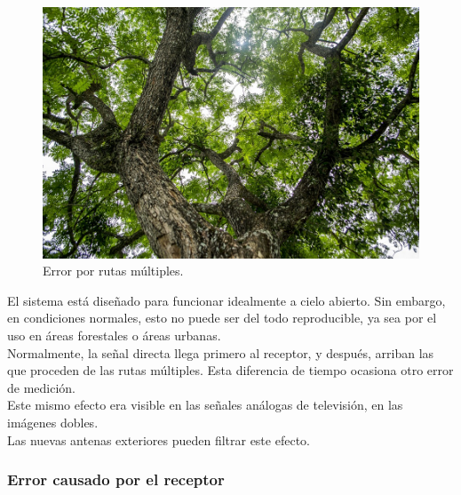 \begin{figure}[H]
\centering
\includegraphics[scale=0.4]{Figures/RutasMult2}
\caption[Error por rutas múltiples.]{Error por rutas múltiples\footnotemark.}
\label{fig:ErrRMul}
\end{figure}


 El sistema está diseñado para funcionar idealmente a cielo abierto. Sin embargo, en condiciones normales, esto no puede ser del todo reproducible, ya sea por el uso en áreas forestales o áreas urbanas. \\
 
Normalmente, la señal directa llega primero al receptor, y después, arriban las que proceden de las rutas múltiples. Esta diferencia de tiempo ocasiona otro error de medición. \\

Este mismo efecto era visible en las señales análogas de televisión, en las imágenes dobles. \\

Las nuevas antenas exteriores pueden filtrar este efecto.

\subsubsection{Error causado por el receptor}

